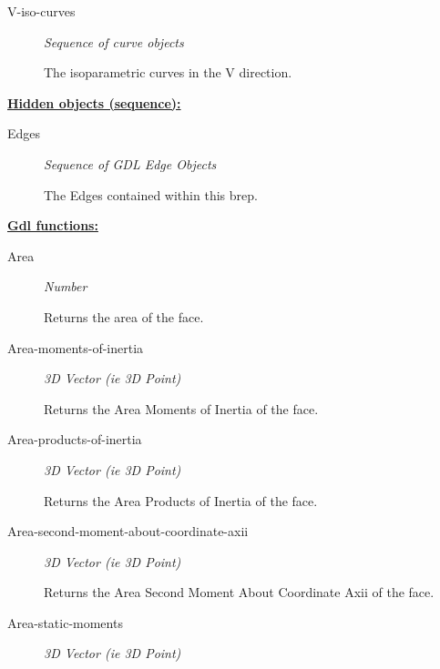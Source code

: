 \documentclass [11pt]{book}
\begin{document}
\begin{itemize}
\begin{description}
\item [V-iso-curves]
\emph{Sequence of curve objects}

 The isoparametric curves in the V direction.




\end{description}






\textbf{
\underline{Hidden objects (sequence):}}

\begin{description}

\item [Edges]
\emph{Sequence of GDL Edge Objects}

 The Edges contained within this brep.




\end{description}






\textbf{
\underline{Gdl functions:}}

\begin{description}

\item [Area]
\emph{Number}

 Returns the area of the face.




\item [Area-moments-of-inertia]
\emph{3D Vector (ie 3D Point)}

 Returns the Area Moments of Inertia of the face.




\item [Area-products-of-inertia]
\emph{3D Vector (ie 3D Point)}

 Returns the Area Products of Inertia of the face.




\item [Area-second-moment-about-coordinate-axii]
\emph{3D Vector (ie 3D Point)}

 Returns the Area Second Moment About Coordinate Axii of the face.




\item [Area-static-moments]
\emph{3D Vector (ie 3D Point)}


\end{description}
\end{itemize}
\end{document}
